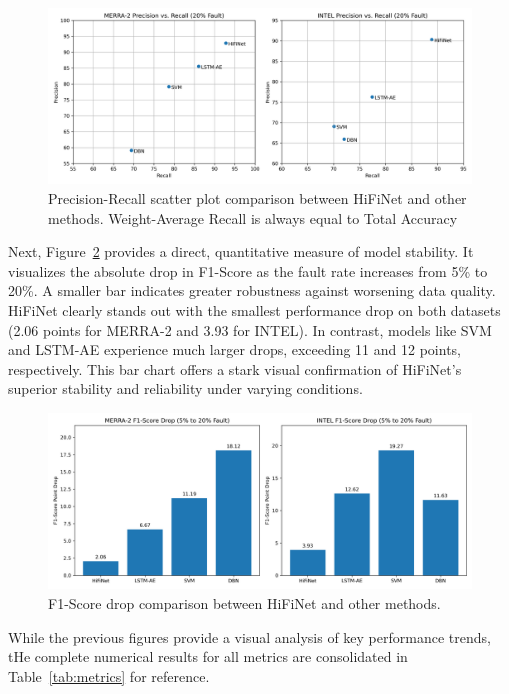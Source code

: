\begin{figure}
  \centering
  \includegraphics[width=\linewidth]{images/pr_scatter.png}
  \caption{Precision-Recall scatter plot comparison between HiFiNet and other methods. Weight-Average Recall is always equal to Total Accuracy}
  \label{fig:pr_scatter}
\end{figure}

Next, Figure~\ref{fig:f1_drop} provides a direct, quantitative measure of model stability. It visualizes the absolute drop in F1-Score as the fault rate increases from 5\% to 20\%. A smaller bar indicates greater robustness against worsening data quality. HiFiNet clearly stands out with the smallest performance drop on both datasets (2.06 points for MERRA-2 and 3.93 for INTEL). In contrast, models like SVM and LSTM-AE experience much larger drops, exceeding 11 and 12 points, respectively. This bar chart offers a stark visual confirmation of HiFiNet's superior stability and reliability under varying conditions.

\begin{figure}
  \centering
  \includegraphics[width=\linewidth]{images/f1_drop.png}
  \caption{F1-Score drop comparison between HiFiNet and other methods.}
  \label{fig:f1_drop}
\end{figure}

While the previous figures provide a visual analysis of key performance trends, tHe complete numerical results for all metrics are consolidated in Table~\ref{tab:metrics} for reference.

